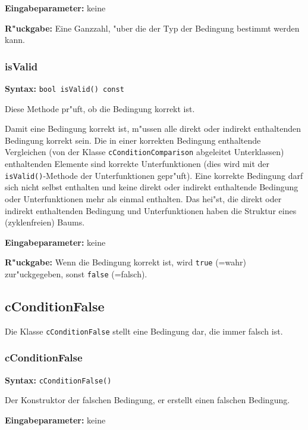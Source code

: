 \bigskip\noindent
\textbf{Eingabeparameter:} keine

\bigskip\noindent
\textbf{R"uckgabe:} Eine Ganzzahl, "uber die der Typ der Bedingung bestimmt werden kann.


\subsubsection{isValid}

\textbf{Syntax:} \verb|bool isValid() const|

\bigskip\noindent
Diese Methode pr"uft, ob die Bedingung korrekt ist.

Damit eine Bedingung korrekt ist, m"ussen alle direkt oder indirekt enthaltenden Bedingung korrekt sein.
Die in einer korrekten Bedingung enthaltende Vergleichen (von der Klasse \verb|cConditionComparison| abgeleitet Unterklassen) enthaltenden Elemente sind korrekte Unterfunktionen (dies wird mit der \verb|isValid()|-Methode der Unterfunktionen gepr"uft).
Eine korrekte Bedingung darf sich nicht selbst enthalten und keine direkt oder indirekt enthaltende Bedingung oder Unterfunktionen mehr als einmal enthalten. Das hei"st, die direkt oder indirekt enthaltenden Bedingung und Unterfunktionen haben die Struktur eines (zyklenfreien) Baums.

\bigskip\noindent
\textbf{Eingabeparameter:} keine

\bigskip\noindent
\textbf{R"uckgabe:} Wenn die Bedingung korrekt ist, wird \verb|true| (=wahr) zur"uckgegeben, sonst \verb|false| (=falsch).


\subsection{cConditionFalse}

Die Klasse \verb|cConditionFalse| stellt eine Bedingung dar, die immer falsch ist.

\subsubsection{cConditionFalse}

\textbf{Syntax:} \verb|cConditionFalse()|

\bigskip\noindent
Der Konstruktor der falschen Bedingung, er erstellt einen falschen Bedingung.

\bigskip\noindent
\textbf{Eingabeparameter:} keine

